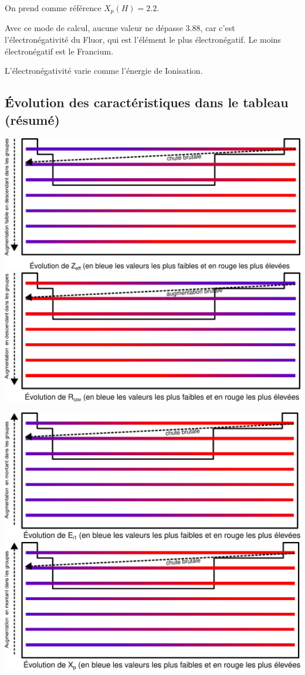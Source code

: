 \documentclass[french]{yLectureNote}
\begin{document}
On prend comme référence $X_p(H) = 2.2$.

Avec ce mode de calcul, aucune valeur ne dépasse 3.88, car c'est l'électronégativité du Fluor, qui est l'élément le plus électronégatif. Le moins électronégatif est le Francium.

L'électronégativité varie comme l'énergie de Ionisation.
\subsection{Évolution des caractéristiques dans le tableau (résumé)}
\includegraphics[scale=0.4]{evo_zeff}\includegraphics[scale=0.4]{evo_rcov}

\includegraphics[scale=0.4]{evo_ei1}\includegraphics[scale=0.4]{evo_xp}
\end{document}
